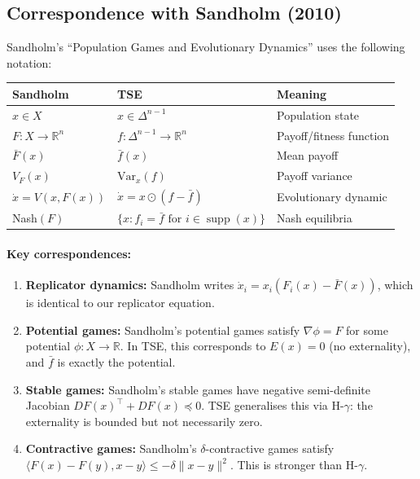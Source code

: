 \documentclass[12pt]{article}
\newcommand{\R}{\mathbb{R}}
\newcommand{\Var}{\mathrm{Var}}
\DeclareMathOperator{\supp}{supp}
\begin{document}
\subsection{Correspondence with Sandholm (2010)}

Sandholm's ``Population Games and Evolutionary Dynamics'' uses the following notation:

\begin{center}
\begin{tabular}{lll}
\toprule
\textbf{Sandholm} & \textbf{TSE} & \textbf{Meaning} \\
\midrule
$x \in X$ & $x \in \Delta^{n-1}$ & Population state \\
$F: X \to \R^n$ & $f: \Delta^{n-1} \to \R^n$ & Payoff/fitness function \\
$\bar{F}(x)$ & $\bar{f}(x)$ & Mean payoff \\
$V_F(x)$ & $\Var_x(f)$ & Payoff variance \\
$\dot{x} = V(x, F(x))$ & $\dot{x} = x \odot (f - \bar{f})$ & Evolutionary dynamic \\
Nash$(F)$ & $\{x : f_i = \bar{f} \text{ for } i \in \supp(x)\}$ & Nash equilibria \\
\bottomrule
\end{tabular}
\end{center}

\paragraph{Key correspondences:}

\begin{enumerate}
\item \textbf{Replicator dynamics:} Sandholm writes $\dot{x}_i = x_i(F_i(x) - \bar{F}(x))$, which is identical to our replicator equation.

\item \textbf{Potential games:} Sandholm's potential games satisfy $\nabla \phi = F$ for some potential $\phi: X \to \R$. In TSE, this corresponds to $E(x) = 0$ (no externality), and $\bar{f}$ is exactly the potential.

\item \textbf{Stable games:} Sandholm's stable games have negative semi-definite Jacobian $DF(x)^\top + DF(x) \preceq 0$. TSE generalises this via H-$\gamma$: the externality is bounded but not necessarily zero.

\item \textbf{Contractive games:} Sandholm's $\delta$-contractive games satisfy $\langle F(x) - F(y), x - y \rangle \leq -\delta \|x - y\|^2$. This is stronger than H-$\gamma$.
\end{enumerate}
\end{document}
